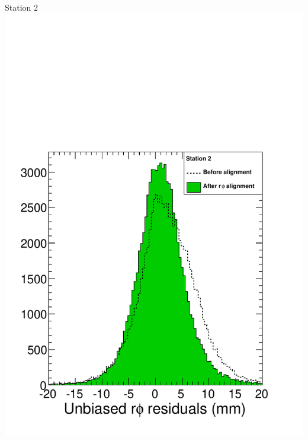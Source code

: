 \documentclass[compress]{beamer}
\begin{document}
\begin{frame}
\begin{columns}
Station 2
\includegraphics[width=\linewidth]{residuals_station2.pdf}


\end{columns}
\end{frame}
\end{document}
